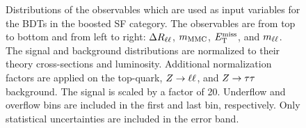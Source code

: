 \begin{figure}[htb]
\begin{subfigure}[t]{0.45\textwidth}
    \end{subfigure}
    \caption{Distributions of the observables which are used as input variables for the BDTs in the boosted SF category.
             The observables are from top to bottom and from left to right: $\Delta R_{\ell\ell}$, $m_\text{MMC}$, $E_\text{T}^\text{miss}$, and $m_{\ell\ell}$.
             The signal and background distributions are normalized to their theory cross-sections and luminosity.
             Additional normalization factors are applied on the top-quark, $Z \to \ell \ell$, and $Z \to \tau \tau$ background.
             The signal is scaled by a factor of 20.
             Underflow and overflow bins are included in the first and last bin, respectively.
             Only statistical uncertainties are included in the error band.}\label{fig:mva:modeling:sr:boostsf}
\end{figure}

